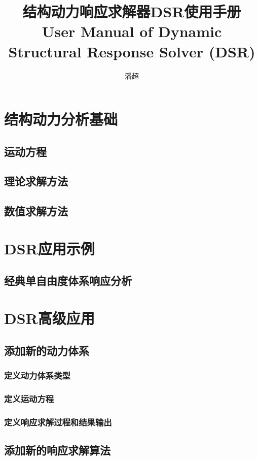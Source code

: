 \documentclass[UTF8]{ctexrep}
\begin{document}
\title{结构动力响应求解器DSR使用手册\\ [2ex] User Manual of Dynamic Structural Response Solver (DSR)}
\author{潘超}
\date{}
\maketitle

\tableofcontents

\chapter{结构动力分析基础}
\section{运动方程}
\section{理论求解方法}
\section{数值求解方法}
\chapter{DSR应用示例}
\section{经典单自由度体系响应分析}
\chapter{DSR高级应用}
\section{添加新的动力体系}
\subsection{定义动力体系类型}
\subsection{定义运动方程}
\subsection{定义响应求解过程和结果输出}
\section{添加新的响应求解算法}
\end{document}
